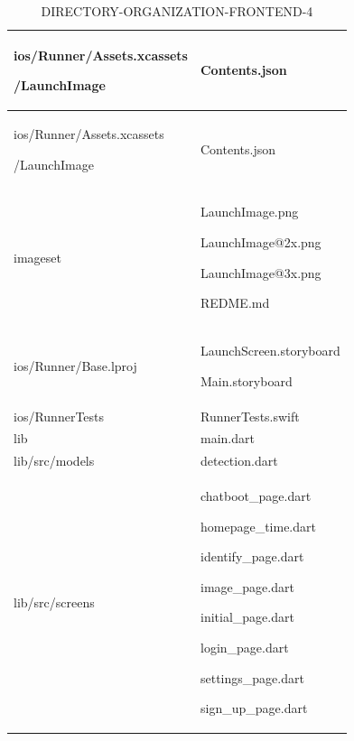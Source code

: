 \documentclass[conference]{IEEEtran}
\begin{document}
\begin{table}[h]
\caption{DIRECTORY-ORGANIZATION-FRONTEND-4}
\def\arraystretch{1.24} \small
    \begin{tabular}{|p{3.7cm}|p{4.1cm}|}
\hline
        

          ios/Runner/Assets.xcassets \par /LaunchImage   & \par Contents.json
          \\ \hline

          ios/Runner/Assets.xcassets \par /LaunchImage  & \par Contents.json
          \\ \hline

          imageset \par   & \par LaunchImage.png \par LaunchImage@2x.png \par LaunchImage@3x.png  \par REDME.md
          \\ \hline

          ios/Runner/Base.lproj    & \par LaunchScreen.storyboard \par Main.storyboard
          \\ \hline

          ios/RunnerTests  & \par RunnerTests.swift
          \\ \hline

          lib   & \par main.dart
          \\ \hline

          lib/src/models   & \par detection.dart
          \\ \hline

          lib/src/screens   & \par chatboot\_page.dart \par homepage\_time.dart \par identify\_page.dart \par image\_page.dart \par initial\_page.dart \par login\_page.dart \par settings\_page.dart \par sign\_up\_page.dart
          \\ \hline      


\end{tabular}
\end{table}
\end{document}
